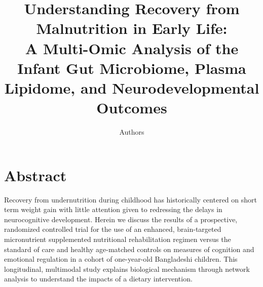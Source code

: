 \documentclass{article}
\title{
  Understanding Recovery from Malnutrition in Early Life:\\
  A Multi-Omic Analysis of the Infant Gut Microbiome, Plasma Lipidome, and Neurodevelopmental Outcomes
}
\author[1]{Authors}
\affil[1]{Affiliations}
\date{}
\begin{document}
\maketitle

\tableofcontents

\section{Abstract}
Recovery from undernutrition during childhood has historically centered on short term weight gain with little attention given to redressing the delays in neurocognitive development.
Herein we discuss the results of a prospective, randomized controlled trial for the use of an enhanced, brain-targeted micronutrient supplemented nutritional rehabilitation regimen versus the standard of care and healthy age-matched controls on measures of cognition and emotional regulation in a cohort of one-year-old Bangladeshi children.
This longitudinal, multimodal study explains biological mechanism through network analysis to understand the impacts of a dietary intervention.
\end{document}
